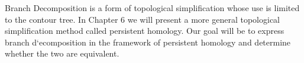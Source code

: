 Branch Decomposition is a form of topological simplification whose use is limited to the contour tree. In Chapter 6 we will present a more general topological simplification method called persistent homology. Our goal will be to express branch d`ecomposition in the framework of persistent homology and determine whether the two are equivalent.


